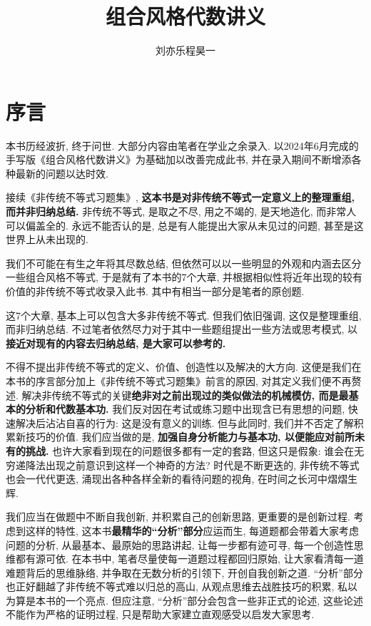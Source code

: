 \documentclass[lang=cn,12pt,thmcnt=section]{elegantbook}
\title{组合风格代数讲义}
\author{刘亦乐\quad 程昊一}
\begin{document}
\maketitle

\tableofcontents


\chapter*{序言}

本书历经波折, 终于问世. 大部分内容由笔者在学业之余录入. 以2024年6月完成的手写版《组合风格代数讲义》为基础加以改善完成此书, 并在录入期间不断增添各种最新的问题以达时效. \par
接续《非传统不等式习题集》, \textbf{这本书是对非传统不等式一定意义上的整理重组, 而并非归纳总结. }非传统不等式, 是取之不尽, 用之不竭的, 是天地造化, 而非常人可以偏盖全的. 永远不能否认的是, 总是有人能提出大家从未见过的问题, 甚至是这世界上从未出现的. \par 
我们不可能在有生之年将其尽数总结, 但依然可以以一些明显的外观和内涵去区分一些组合风格不等式, 于是就有了本书的7个大章, 并根据相似性将近年出现的较有价值的非传统不等式收录入此书. 其中有相当一部分是笔者的原创题. \par
这7个大章, 基本上可以包含大多非传统不等式. 但我们依旧强调, 这仅是整理重组, 而非归纳总结. 不过笔者依然尽力对于其中一些题组提出一些方法或思考模式, 以\textbf{接近对现有的内容去归纳总结, 是大家可以参考的. }\par
不得不提出非传统不等式的定义、价值、创造性以及解决的大方向. 这便是我们在本书的序言部分加上《非传统不等式习题集》前言的原因, 对其定义我们便不再赘述. 解决非传统不等式的关键\textbf{绝非对之前出现过的类似做法的机械模仿, 而是最基本的分析和代数基本功. }我们反对因在考试或练习题中出现含已有思想的问题, 快速解决后沾沾自喜的行为: 这是没有意义的训练. 但与此同时, 我们并不否定了解积累新技巧的价值. 我们应当做的是, \textbf{加强自身分析能力与基本功, 以便能应对前所未有的挑战. }也许大家看到现在的问题很多都有一定的套路, 但这只是假象: 谁会在无穷递降法出现之前意识到这样一个神奇的方法? 时代是不断更迭的, 非传统不等式也会一代代更迭, 涌现出各种各样全新的看待问题的视角, 在时间之长河中熠熠生辉. \par 
我们应当在做题中不断自我创新, 并积累自己的创新思路, 更重要的是创新过程. 考虑到这样的特性, 这本书\textbf{最精华的“分析”部分}应运而生, 每道题都会带着大家考虑问题的分析, 从最基本、最原始的思路讲起, 让每一步都有迹可寻, 每一个创造性思维都有源可依. 在本书中, 笔者尽量使每一道题过程都回归原始, 让大家看清每一道难题背后的思维脉络, 并争取在无数分析的引领下, 开创自我创新之道. “分析”部分也正好翻越了非传统不等式难以归总的高山, 从观点思维去战胜技巧的积累, 私以为算是本书的一个亮点. 但应注意, “分析”部分会包含一些非正式的论述, 这些论述不能作为严格的证明过程, 只是帮助大家建立直观感受以启发大家思考.\par
\end{document}
